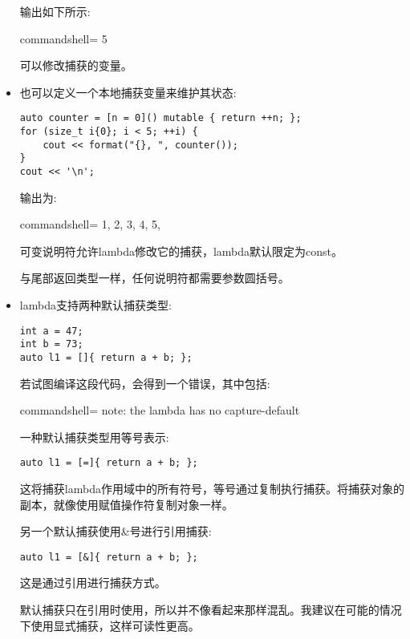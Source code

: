 \begin{itemize}
输出如下所示:

\begin{tcblisting}{commandshell={}}
5
\end{tcblisting}

可以修改捕获的变量。


\item 

也可以定义一个本地捕获变量来维护其状态:

\begin{lstlisting}[style=styleCXX]
auto counter = [n = 0]() mutable { return ++n; };
for (size_t i{0}; i < 5; ++i) {
	cout << format("{}, ", counter());
}
cout << '\n';
\end{lstlisting}

输出为:

\begin{tcblisting}{commandshell={}}
1, 2, 3, 4, 5,
\end{tcblisting}

可变说明符允许lambda修改它的捕获，lambda默认限定为const。

与尾部返回类型一样，任何说明符都需要参数圆括号。

\item 
lambda支持两种默认捕获类型:

\begin{lstlisting}[style=styleCXX]
int a = 47;
int b = 73;
auto l1 = []{ return a + b; };
\end{lstlisting}

若试图编译这段代码，会得到一个错误，其中包括:

\begin{tcblisting}{commandshell={}}
note: the lambda has no capture-default
\end{tcblisting}

一种默认捕获类型用等号表示:

\begin{lstlisting}[style=styleCXX]
auto l1 = [=]{ return a + b; };
\end{lstlisting}

这将捕获lambda作用域中的所有符号，等号通过复制执行捕获。将捕获对象的副本，就像使用赋值操作符复制对象一样。

另一个默认捕获使用\&号进行引用捕获:

\begin{lstlisting}[style=styleCXX]
auto l1 = [&]{ return a + b; };
\end{lstlisting}

这是通过引用进行捕获方式。

默认捕获只在引用时使用，所以并不像看起来那样混乱。我建议在可能的情况下使用显式捕获，这样可读性更高。

\end{itemize}

